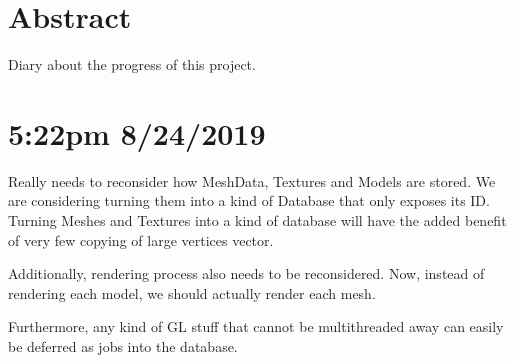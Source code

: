 \documentclass[a4paper, 14pt]{extarticle}
\begin{document}
\section{Abstract}

Diary about the progress of this project.

\section{5:22pm 8/24/2019}

Really needs to reconsider how MeshData, Textures and Models are stored.
We are considering turning them into a kind of Database that only exposes its ID.
Turning Meshes and Textures into a kind of database will have the added benefit of very few copying of large vertices vector.

Additionally, rendering process also needs to be reconsidered.
Now, instead of rendering each model, we should actually render each mesh.

Furthermore, any kind of GL stuff that cannot be multithreaded away can easily be deferred as jobs into the database.
\end{document}
